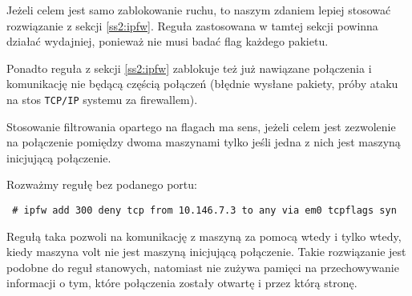 Jeżeli celem jest samo zablokowanie ruchu, to naszym zdaniem lepiej stosować rozwiązanie z sekcji \ref{ss2:ipfw}.
Reguła zastosowana w tamtej sekcji powinna działać wydajniej, ponieważ nie musi badać flag \tcp{} każdego pakietu.

Ponadto reguła z sekcji \ref{ss2:ipfw} zablokuje też już nawiązane połączenia i komunikację nie będącą częścią połączeń (błędnie wysłane pakiety, próby ataku na stos \texttt{TCP/IP} systemu za firewallem).

Stosowanie filtrowania opartego na flagach \tcp{} ma sens, jeżeli celem jest zezwolenie na połączenie pomiędzy dwoma maszynami tylko jeśli jedna z nich jest maszyną inicjującą połączenie.

Rozważmy regułę bez podanego portu:

\begin{lstlisting}
 # ipfw add 300 deny tcp from 10.146.7.3 to any via em0 tcpflags syn
\end{lstlisting}

Regułą taka pozwoli na komunikację z maszyną \volt{} za pomocą \tcp{} wtedy i tylko wtedy, kiedy maszyna volt nie jest maszyną inicjującą połączenie.
Takie rozwiązanie jest podobne do reguł stanowych, natomiast nie zużywa pamięci na przechowywanie informacji o tym, które połączenia zostały otwartę i przez którą stronę.
